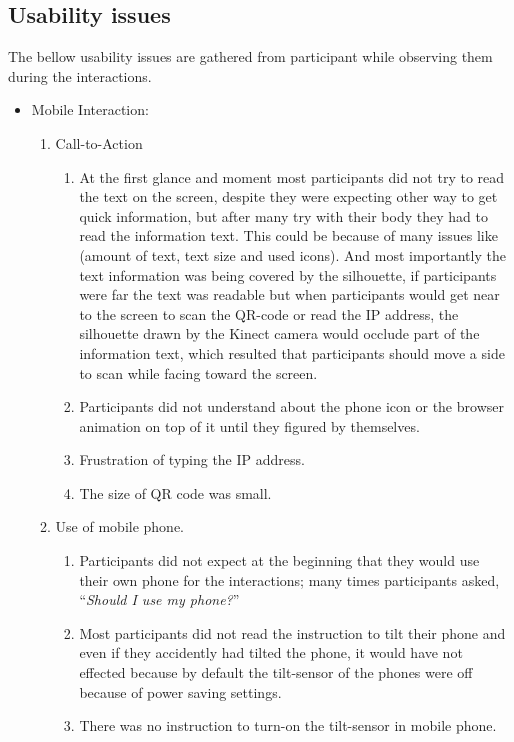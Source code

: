 \subsection{Usability issues}
The bellow usability issues are gathered from participant while observing them during the interactions.


\begin{itemize}

\item Mobile Interaction: \\


\begin{enumerate}
\item	Call-to-Action
\begin{enumerate}
\item	At the first glance and moment most participants did not try to read the text on the screen, despite they were expecting other way to get quick information, but after many try with their body they had to read the information text. This could be because of many issues like (amount of text, text size and used icons). And most importantly the text information was being covered by the silhouette, if participants were far the text was readable but when participants would get near to the screen to scan the QR-code or read the IP address, the silhouette drawn by the Kinect camera would occlude part of the information text, which resulted that participants should move a side to scan while facing toward the screen.
\item	Participants did not understand about the phone icon or the browser animation on top of it until they figured by themselves.
\item	Frustration of typing the IP address.
\item	The size of QR code was small.
\end{enumerate}

\item	Use of mobile phone.
\begin{enumerate}
\item	Participants did not expect at the beginning that they would use their own phone for the interactions; many times participants asked, ``\emph{Should I use my phone?}'' 
\item	Most participants did not read the instruction to tilt their phone and even if they accidently had tilted the phone, it would have not effected because by default the tilt-sensor of the phones were off because of power saving settings. 
\item	There was no instruction to turn-on the tilt-sensor in mobile phone.
\end{enumerate}


\end{enumerate}
\end{itemize}
